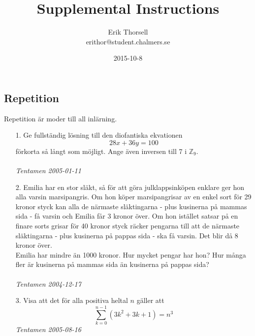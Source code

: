 \documentclass{article}
\title{Supplemental Instructions}
\author{Erik Thorsell \\ 
		\small{erithor@student.chalmers.se}
}
\date{2015-10-8}
\begin{document}
\maketitle


\subsection*{Repetition}
Repetition är moder till all inlärning.
\begin{enumerate}

\item[1.]
Ge fullständig lösning till den diofantiska ekvationen $$28x+36y=100$$ förkorta 
så långt som möjligt. Ange även inversen till 7 i $\mathbb{Z}_9$.
\\ \\ {\it Tentamen 2005-01-11}\\

\item[2.]
Emilia har en stor släkt, så för att göra julklappsinköpen enklare ger hon alla 
varsin marsipangris. Om hon köper marsipangrisar av en enkel sort för 29 kronor 
styck kan alla de närmaste släktingarna - plus kusinerna på mammas sida - få 
varsin och Emilia får 3 kronor över. Om hon istället satsar på en finare sorts 
grisar för 40 kronor styck räcker pengarna till att de närmaste släktingarna - plus 
kusinerna på pappas sida - ska få varsin. Det blir då 8 kronor över.\\ 
Emilia har mindre än 1000 kronor. Hur mycket pengar har hon? Hur många fler är 
kusinerna på mammas sida än kusinerna på pappas sida?
\\ \\{\it Tentamen 2004-12-17}\\

\item[3.]
Visa att det för alla positiva heltal $n$ gäller att 
$$\sum_{k=0}^{n-1} (3k^2+3k+1)=n^3$$
{\it Tentamen 2005-08-16}\\
\end{enumerate}
\end{document}
